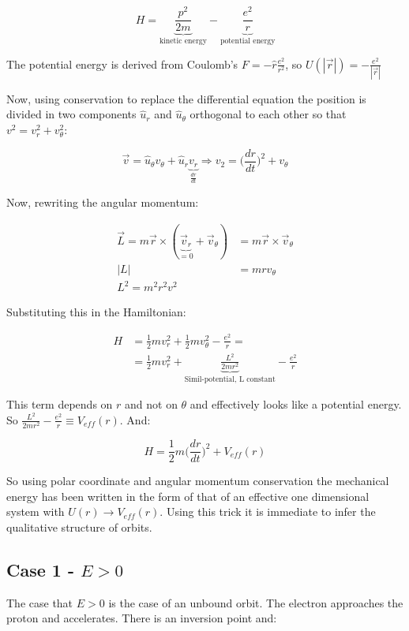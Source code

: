   $$H = \underbrace{\frac{p^2}{2m}}_{\text{kinetic energy}}-\underbrace{\frac{e^2}{r}}_{\text{potential energy}}$$

  The potential energy is derived from Coulomb's $F=-\hat{r}\frac{e^2}{r^2}$, so $U(|\vec{r}|) = -\frac{e^2}{|\vec{r}|}$


  Now, using conservation to replace the differential equation the position is divided in two components $\hat{u}_r$ and $\hat{u}_\theta$ orthogonal to each other so that $v^2 = v_r^2+v_\theta^2$:

  $$\vec{v} = \hat{u}_\theta v_\theta +\hat{u}_r\underbrace{v_r}_{\frac{d{r}}{d{t}}}\Rightarrow v_2 = \biggl(\frac{d{r}}{d{t}}\biggr)^2+v_\theta$$

  Now, rewriting the angular momentum:

  \begin{align*}
    \vec{L} = m \vec{r}\times(\underbrace{\vec{v}_r}_{=0}+\vec{v}_\theta) &= m \vec{r}\times\vec{v}_\theta\\
    |L| &= mrv_\theta\\
    L^2 = m^2r^2v^2
  \end{align*}

  Substituting this in the Hamiltonian:

  \begin{align*}
    H &= \frac{1}{2}mv_r^2 + \frac{1}{2}mv_\theta^2 - \frac{e^2}{r}=\\
      &=\frac{1}{2}mv_r^2 + \underbrace{\frac{L^2}{2mr^2}}_{\text{Simil-potential, L constant}} - \frac{e^2}{r}
  \end{align*}
  
  This term depends on $r$ and not on $\theta$ and effectively looks like a potential energy.
  So $\frac{L^2}{2mr^2}-\frac{e^2}{r}\equiv V_{eff}(r)$.
  And:

  $$H = \frac{1}{2}m\biggl(\frac{d{r}}{d{t}}\biggr)^2+V_{eff}(r)$$

  So using polar coordinate and angular momentum conservation the mechanical energy has been written in the form of that of an effective one dimensional system with $U(r) \rightarrow V_{eff}(r)$.
  Using this trick it is immediate to infer the qualitative structure of orbits.

  \subsection{Case 1 - $E>0$}
  The case that $E>0$ is the case of an unbound orbit.
  The electron approaches the proton and accelerates.
  There is an inversion point and:

